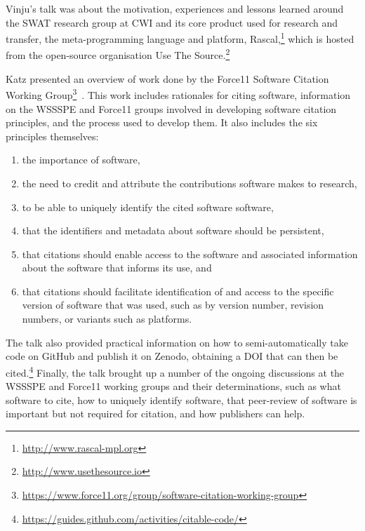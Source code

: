 \documentclass[a4paper,UKenglish]{dagrep}
\begin{document}

Vinju's talk was about the motivation, experiences and lessons learned around the SWAT research group at CWI and its core product used for research and transfer, the meta-programming language and platform, Rascal,\footnote{\url{http://www.rascal-mpl.org}} which is hosted from the open-source organisation Use The Source.\footnote{\url{http://www.usethesource.io}}


Katz presented an overview of work done by the Force11 Software Citation Working Group\footnote{\url{https://www.force11.org/group/software-citation-working-group}}~\cite{10.7717/peerj-cs.86}.
This work includes rationales for citing software, information on the WSSSPE and Force11 groups involved in developing software citation principles, and the process used to develop them.
It also includes the six principles themselves:\begin{enumerate}
\item the importance of software,
\item the need to credit and attribute the contributions software makes to research,
\item to be able to uniquely identify the cited software software,
\item that the identifiers and metadata about software should be persistent,
\item that citations should enable access to the software and associated information about the software that informs its use,
and
\item that citations should facilitate identification of and access to the specific version of software that was used, such as by version number, revision numbers, or variants such as platforms.
\end{enumerate}
%
The talk also provided practical information on how to semi-automatically take code on GitHub and publish it on Zenodo, obtaining a DOI that can then be cited.\footnote{\url{https://guides.github.com/activities/citable-code/}}
Finally, the talk brought up a number of the ongoing discussions at the WSSSPE and Force11 working groups and their determinations, such as what software to cite, how to uniquely identify software, that peer-review of software is important but not required for citation, and how publishers can help.
\end{document}
